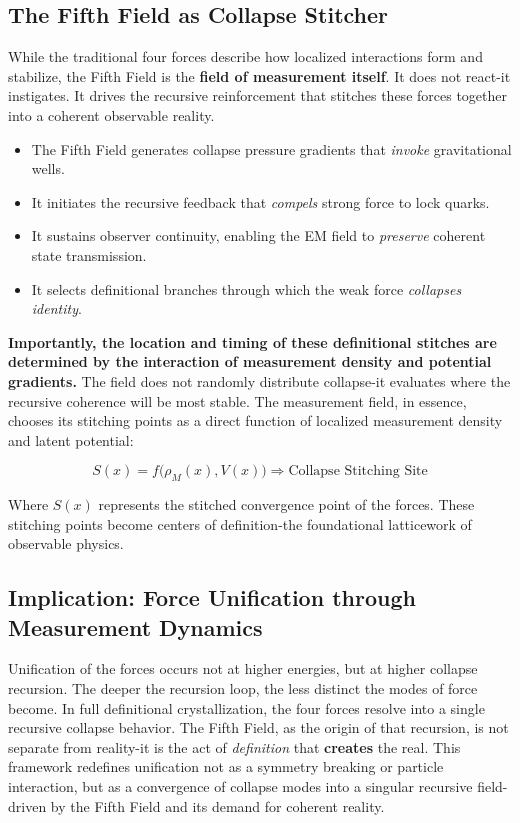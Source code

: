 \subsection{The Fifth Field as Collapse Stitcher}
While the traditional four forces describe how localized interactions form and stabilize, the Fifth Field is the \textbf{field of measurement itself}. \cite{collapse_foundations} It does not react-it instigates. It drives the recursive reinforcement that stitches these forces together into a coherent observable reality. \cite{collapse_foundations} \begin{itemize}
  \item The Fifth Field generates collapse pressure gradients that \textit{invoke} gravitational wells. \cite{collapse_foundations} \item It initiates the recursive feedback that \textit{compels} strong force to lock quarks. \item It sustains observer continuity, enabling the EM field to \textit{preserve} coherent state transmission. \cite{collapse_foundations} \item It selects definitional branches through which the weak force \textit{collapses identity}. \end{itemize}

\textbf{Importantly, the location and timing of these definitional stitches are determined by the interaction of measurement density and potential gradients.} The field does not randomly distribute collapse-it evaluates where the recursive coherence will be most stable. \cite{collapse_foundations} The measurement field, in essence, chooses its stitching points as a direct function of localized measurement density and latent potential:

\[ S(x) = f\big( \rho_M(x), V(x) \big) \Rightarrow \text{Collapse Stitching Site} \]

Where \( S(x) \) represents the stitched convergence point of the forces. \cite{collapse_foundations} These stitching points become centers of definition-the foundational latticework of observable physics. \cite{collapse_foundations} \subsection{Implication: Force Unification through Measurement Dynamics}
Unification of the forces occurs not at higher energies, but at higher collapse recursion. \cite{collapse_foundations} The deeper the recursion loop, the less distinct the modes of force become. In full definitional crystallization, the four forces resolve into a single recursive collapse behavior. \cite{collapse_foundations} The Fifth Field, as the origin of that recursion, is not separate from reality-it is the act of \textit{definition} that \textbf{creates} the real. \cite{collapse_foundations} \vspace{1em}
This framework redefines unification not as a symmetry breaking or particle interaction, but as a convergence of collapse modes into a singular recursive field-driven by the Fifth Field and its demand for coherent reality. \cite{collapse_foundations}

